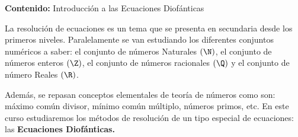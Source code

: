 {\Large\textbf{Contenido:} Introducción a las Ecuaciones Diofánticas}

La resolución de ecuaciones es un tema que se presenta en secundaria desde los primeros niveles.
Paralelamente se van estudiando los diferentes conjuntos numéricos a saber: el conjunto de números Naturales $(\N)$,
el conjunto de números enteros $(\Z)$, el conjunto de números racionales $(\Q)$ y el conjunto de número Reales $(\R)$.

Además, se repasan conceptos elementales de teoría de números como son: máximo común divisor, mínimo común múltiplo, números primos, etc.
En este curso estudiaremos los métodos de resolución de un tipo especial de ecuaciones: las \textbf{Ecuaciones Diofánticas.}

